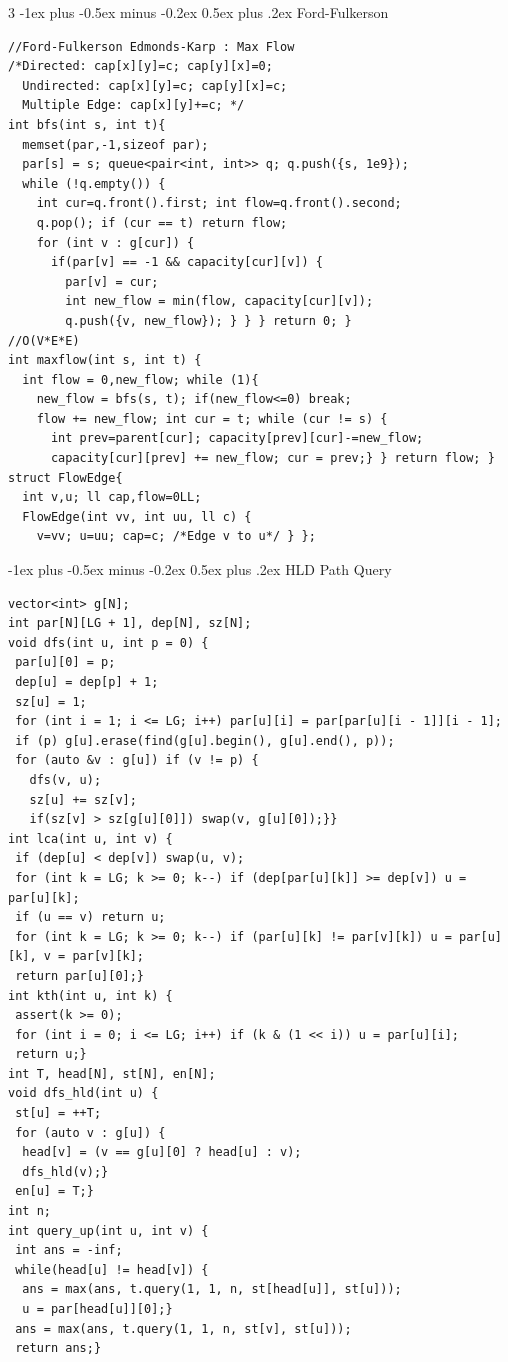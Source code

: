 \documentclass[8pt,a4paper,onesided]{article}
\makeatletter
\renewcommand{\subsection}{\@startsection{subsection}{2}{0mm}
    {-1ex plus -0.5ex minus -0.2ex} %
    {0.5ex plus .2ex}                %
    {\normalfont\large\bfseries}}    %
\makeatother
\begin{document}
\begin{multicols}{3}
\subsection{Ford-Fulkerson}
\begin{verbatim}
//Ford-Fulkerson Edmonds-Karp : Max Flow
/*Directed: cap[x][y]=c; cap[y][x]=0;
  Undirected: cap[x][y]=c; cap[y][x]=c;
  Multiple Edge: cap[x][y]+=c; */
int bfs(int s, int t){
  memset(par,-1,sizeof par);
  par[s] = s; queue<pair<int, int>> q; q.push({s, 1e9});
  while (!q.empty()) {
    int cur=q.front().first; int flow=q.front().second;
    q.pop(); if (cur == t) return flow;
    for (int v : g[cur]) {
      if(par[v] == -1 && capacity[cur][v]) {
        par[v] = cur; 
        int new_flow = min(flow, capacity[cur][v]);
        q.push({v, new_flow}); } } } return 0; }
//O(V*E*E)
int maxflow(int s, int t) {
  int flow = 0,new_flow; while (1){
    new_flow = bfs(s, t); if(new_flow<=0) break;
    flow += new_flow; int cur = t; while (cur != s) {
      int prev=parent[cur]; capacity[prev][cur]-=new_flow;
      capacity[cur][prev] += new_flow; cur = prev;} } return flow; }
struct FlowEdge{
  int v,u; ll cap,flow=0LL;
  FlowEdge(int vv, int uu, ll c) {
    v=vv; u=uu; cap=c; /*Edge v to u*/ } };
\end{verbatim}
\subsection{HLD Path Query}
\begin{verbatim}
vector<int> g[N];
int par[N][LG + 1], dep[N], sz[N];
void dfs(int u, int p = 0) {
 par[u][0] = p;
 dep[u] = dep[p] + 1;
 sz[u] = 1;
 for (int i = 1; i <= LG; i++) par[u][i] = par[par[u][i - 1]][i - 1];
 if (p) g[u].erase(find(g[u].begin(), g[u].end(), p));
 for (auto &v : g[u]) if (v != p) {
   dfs(v, u);
   sz[u] += sz[v];
   if(sz[v] > sz[g[u][0]]) swap(v, g[u][0]);}}
int lca(int u, int v) {
 if (dep[u] < dep[v]) swap(u, v);
 for (int k = LG; k >= 0; k--) if (dep[par[u][k]] >= dep[v]) u = par[u][k];
 if (u == v) return u;
 for (int k = LG; k >= 0; k--) if (par[u][k] != par[v][k]) u = par[u][k], v = par[v][k];
 return par[u][0];}
int kth(int u, int k) {
 assert(k >= 0);
 for (int i = 0; i <= LG; i++) if (k & (1 << i)) u = par[u][i];
 return u;}
int T, head[N], st[N], en[N];
void dfs_hld(int u) {
 st[u] = ++T;
 for (auto v : g[u]) {
  head[v] = (v == g[u][0] ? head[u] : v);
  dfs_hld(v);}
 en[u] = T;}
int n;
int query_up(int u, int v) {
 int ans = -inf;
 while(head[u] != head[v]) {
  ans = max(ans, t.query(1, 1, n, st[head[u]], st[u]));
  u = par[head[u]][0];}
 ans = max(ans, t.query(1, 1, n, st[v], st[u]));
 return ans;}
\end{verbatim}

\end{multicols}
\end{document}
